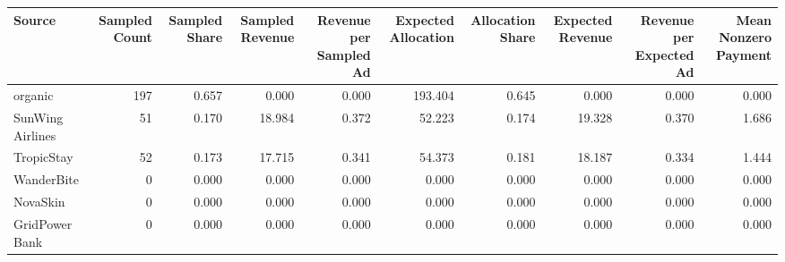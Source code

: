 \begin{tabular}{lrrrrrrrrr}
\hline
Source & Sampled Count & Sampled Share & Sampled Revenue & Revenue per Sampled Ad & Expected Allocation & Allocation Share & Expected Revenue & Revenue per Expected Ad & Mean Nonzero Payment \\
\hline
organic & 197 & 0.657 & 0.000 & 0.000 & 193.404 & 0.645 & 0.000 & 0.000 & 0.000 \\
SunWing Airlines & 51 & 0.170 & 18.984 & 0.372 & 52.223 & 0.174 & 19.328 & 0.370 & 1.686 \\
TropicStay & 52 & 0.173 & 17.715 & 0.341 & 54.373 & 0.181 & 18.187 & 0.334 & 1.444 \\
WanderBite & 0 & 0.000 & 0.000 & 0.000 & 0.000 & 0.000 & 0.000 & 0.000 & 0.000 \\
NovaSkin & 0 & 0.000 & 0.000 & 0.000 & 0.000 & 0.000 & 0.000 & 0.000 & 0.000 \\
GridPower Bank & 0 & 0.000 & 0.000 & 0.000 & 0.000 & 0.000 & 0.000 & 0.000 & 0.000 \\
\hline
\end{tabular}
